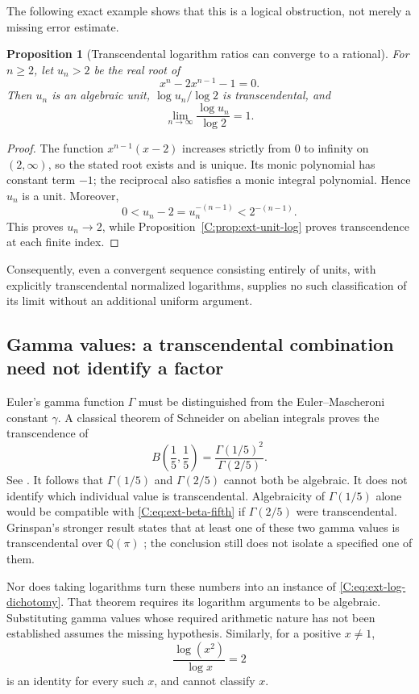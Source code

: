 \documentclass[11pt,a4paper]{article}
\newtheorem{proposition}[theorem]{Proposition}
\theoremstyle{definition}
\theoremstyle{remark}
\numberwithin{equation}{section}
\begin{document}
The following exact example shows that this is a logical obstruction, not
merely a missing error estimate.

\begin{proposition}[Transcendental logarithm ratios can converge to a rational]
\label{C:prop:ext-unit-limit}
For $n\ge2$, let $u_n>2$ be the real root of
\[
 x^n-2x^{n-1}-1=0.
\]
Then $u_n$ is an algebraic unit,
$\log u_n/\log2$ is transcendental, and
\[
 \lim_{n\to\infty}\frac{\log u_n}{\log2}=1.
\]
\end{proposition}
\begin{proof}
The function $x^{n-1}(x-2)$ increases strictly from $0$ to infinity on
$(2,\infty)$, so the stated root exists and is unique.  Its monic
polynomial has constant term $-1$; the reciprocal also satisfies a monic
integral polynomial.  Hence $u_n$ is a unit.  Moreover,
\[
 0<u_n-2=u_n^{-(n-1)}<2^{-(n-1)}.
\]
This proves $u_n\to2$, while Proposition~\ref{C:prop:ext-unit-log}
proves transcendence at each finite index.
\end{proof}

Consequently, even a convergent sequence consisting entirely of units,
with explicitly transcendental normalized logarithms, supplies no such
classification of its limit without an additional uniform argument.

\subsection{Gamma values: a transcendental combination need not identify a factor}

Euler's gamma function $\Gamma$ must be distinguished from the
Euler--Mascheroni constant $\gamma$.  A classical theorem of Schneider on
abelian integrals proves the transcendence of
\begin{equation}
 B\left(\frac15,\frac15\right)
 =\frac{\Gamma(1/5)^2}{\Gamma(2/5)}.
 \label{C:eq:ext-beta-fifth}
\end{equation}
See \cite{R083,R084}.  It follows that $\Gamma(1/5)$ and
$\Gamma(2/5)$ cannot both be algebraic.  It does not identify which
individual value is transcendental.  Algebraicity of $\Gamma(1/5)$ alone
would be compatible with \eqref{C:eq:ext-beta-fifth} if $\Gamma(2/5)$ were
transcendental.  Grinspan's stronger result states that at least one of
these two gamma values is transcendental over $\mathbb Q(\pi)$
\cite{R085}; the conclusion still does not isolate a specified
one of them.

Nor does taking logarithms turn these numbers into an instance of
\eqref{C:eq:ext-log-dichotomy}.  That theorem requires its logarithm
arguments to be algebraic.  Substituting gamma values whose required
arithmetic nature has not been established assumes the missing hypothesis.
Similarly, for a positive $x\ne1$,
\[
 \frac{\log(x^2)}{\log x}=2
\]
is an identity for every such $x$, and cannot classify $x$.
\end{document}
